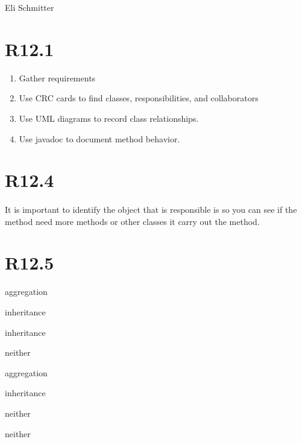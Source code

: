 \documentclass{article}
\begin{document}
\begin{flushleft}
  Eli Schmitter
\end{flushleft}
\section{R12.1}
\begin{enumerate}
  \item Gather requirements
  \item Use CRC cards to find classes, responsibilities, and collaborators
  \item Use UML diagrams to record class relationships.
  \item Use javadoc to document method behavior.
\end{enumerate}
\section{R12.4}
\paragraph{}
It is important to identify the object that is responsible is so you can see if the method need more methods or other classes it carry out the method.
\section{R12.5}
\begin{alphalist}
  \item aggregation
  \item inheritance
  \item inheritance
  \item neither
  \item aggregation
  \item inheritance
  \item neither
  \item neither
\end{alphalist}
\end{document}
